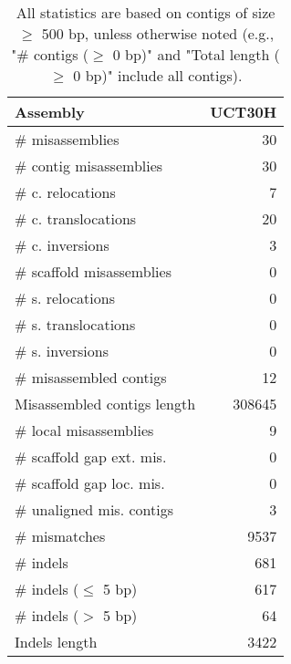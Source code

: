 \documentclass[12pt,a4paper]{article}
\begin{document}
\begin{table}[ht]
\begin{center}
\caption{All statistics are based on contigs of size $\geq$ 500 bp, unless otherwise noted (e.g., "\# contigs ($\geq$ 0 bp)" and "Total length ($\geq$ 0 bp)" include all contigs).}
\begin{tabular}{|l*{1}{|r}|}
\hline
Assembly & UCT30H \\ \hline
\# misassemblies & 30 \\ \hline
\hspace{2mm}\# contig misassemblies & 30 \\ \hline
\hspace{5mm}\# c. relocations & 7 \\ \hline
\hspace{5mm}\# c. translocations & 20 \\ \hline
\hspace{5mm}\# c. inversions & 3 \\ \hline
\hspace{2mm}\# scaffold misassemblies & 0 \\ \hline
\hspace{5mm}\# s. relocations & 0 \\ \hline
\hspace{5mm}\# s. translocations & 0 \\ \hline
\hspace{5mm}\# s. inversions & 0 \\ \hline
\# misassembled contigs & 12 \\ \hline
Misassembled contigs length & 308645 \\ \hline
\# local misassemblies & 9 \\ \hline
\# scaffold gap ext. mis. & 0 \\ \hline
\# scaffold gap loc. mis. & 0 \\ \hline
\# unaligned mis. contigs & 3 \\ \hline
\# mismatches & 9537 \\ \hline
\# indels & 681 \\ \hline
\hspace{5mm}\# indels ($\leq$ 5 bp) & 617 \\ \hline
\hspace{5mm}\# indels ($>$ 5 bp) & 64 \\ \hline
Indels length & 3422 \\ \hline
\end{tabular}
\end{center}
\end{table}
\end{document}
